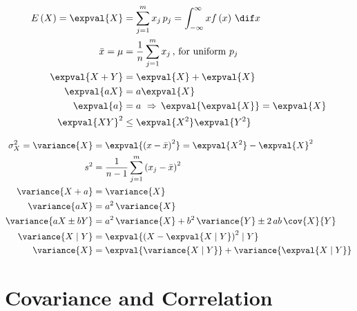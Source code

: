 \begin{subequations}\label{eq:stats:exp_relations}
\begin{align}
E\left(X\right) = \expval{X} &= \sum_{j=1}^{m} x_{j} \, p_{j} = \int_{-\infty}^{\infty} x f\left(x\right) \, \dif x \label{eq:stats:exp_relations:def} \\
\bar{x} = \mu &= \frac{1}{n} \sum_{j=1}^{m} x_{j}\,,\,\text{for uniform}~p_{j} \label{eq:stats:exp_relations:mean} \\
\expval{X+Y} &= \expval{X} + \expval{X} \label{eq:stats:exp_relations:add} \\
\expval{a X} &= a \expval{X} \label{eq:stats:exp_relations:mult} \\
\expval{a} &= a \,\, \Rightarrow \, \expval{\expval{X}} = \expval{X} \label{eq:stats:exp_relations:self} \\
\expval{X Y}^{2} &\leq \expval{X^{2}} \expval{Y^{2}} \label{eq:stats:exp_relations:cbs_ineq}
\end{align}
\end{subequations}

\begin{subequations}\label{eq:stats:var_relations}
\begin{align}
\sigma_{X}^{2} = \variance{X} &= \expval{\left(x-\bar{x}\right)^{2}} = \expval{X^{2}} - \expval{X}^{2} \label{eq:stats:var_relations:def} \\
s^{2} &= \frac{1}{n-1} \sum_{j=1}^{m} \left( x_{j} - \bar{x}\right)^{2} \label{eq:stats:var_relations:sample} \\
\variance{X+a} &= \variance{X} \label{eq:stats:var_relations:add} \\
\variance{a X} &= a^{2} \, \variance{X} \label{eq:stats:var_relations:mult} \\
\variance{a X \pm b Y} &= a^{2} \, \variance{X} + b^{2} \, \variance{Y} \pm 2 \, ab \, \cov{X}{Y} \label{eq:stats:var_relations:linear} \\
\variance{X \mid Y} &= \expval{\left(X - \expval{X \mid Y}\right)^{2} \mid Y} \label{eq:stats:var_relations:conditional1} \\
\variance{X} &= \expval{\variance{X \mid Y}} + \variance{\expval{X \mid Y}} \label{eq:stats:var_relations:conditional2}
\end{align}
\end{subequations}

\section{Covariance and Correlation}
\label{stats:corr_covar}

